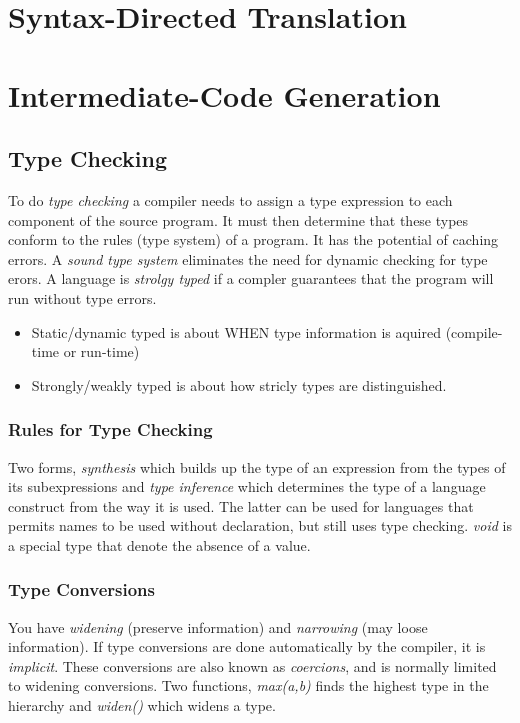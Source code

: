 \documentclass{article}
\begin{document}
\section{Syntax-Directed Translation} %
\label{sec:Syntax-Directed Translation}


\section{Intermediate-Code Generation} %
\label{sec:Intermediate-Code Generation}
\subsection{Type Checking} %
\label{sub:Type Checking}
To do \emph{type checking} a compiler needs to assign a type expression to each component of the source program. It must then determine that these types conform to the rules (type system) of a program. It has the potential of caching errors. A \emph{sound type system} eliminates the need for dynamic checking for type erors. A language is \emph{strolgy typed} if a compler guarantees that the program will run without type errors.
\begin{itemize}
	\item Static/dynamic typed is about WHEN type information is aquired (compile-time or run-time)
	\item Strongly/weakly typed is about how stricly types are distinguished.
\end{itemize}
\subsubsection{Rules for Type Checking} %
\label{ssub:Rules for Type Checking}
Two forms, \emph{synthesis} which builds up the type of an expression from the types of its subexpressions and \emph{type inference} which determines the type of a language construct from the way it is used. The latter can be used for languages that permits names to be used without declaration, but still uses type checking. \emph{void} is a special type that denote the absence of a value.
\subsubsection{Type Conversions} %
\label{ssub:Type Conversions}
You have \emph{widening} (preserve information) and \emph{narrowing} (may loose information). If type conversions are done automatically by the compiler, it is \emph{implicit}. These conversions are also known as \emph{coercions}, and is normally limited to widening conversions. Two functions, \emph{max(a,b)} finds the highest type in the hierarchy and \emph{widen()} which widens a type.
\end{document}
